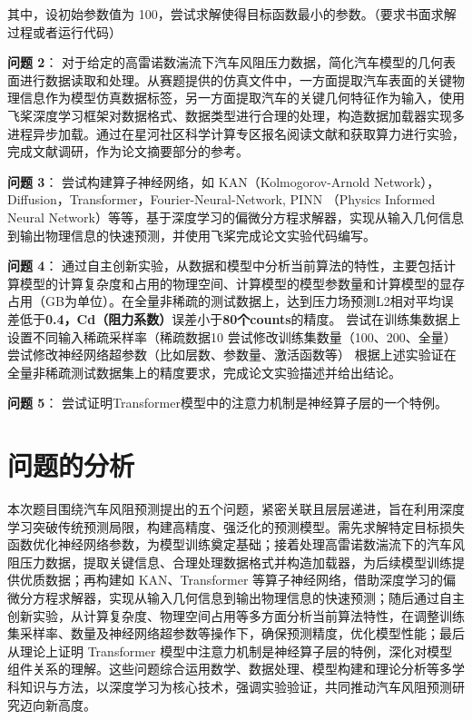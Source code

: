 \documentclass{MMCStyle}
\begin{document}
其中，设初始参数值为 100，尝试求解使得目标函数最小的参数。（要求书面求解过程或者运行代码）

\textbf{问题 2}：
对于给定的高雷诺数湍流下汽车风阻压力数据，简化汽车模型的几何表面进行数据读取和处理。从赛题提供的仿真文件中，一方面提取汽车表面的关键物理信息作为模型仿真数据标签，另一方面提取汽车的关键几何特征作为输入，使用飞桨深度学习框架对数据格式、数据类型进行合理的处理，构造数据加载器实现多进程异步加载。通过在星河社区科学计算专区报名阅读文献和获取算力进行实验，完成文献调研，作为论文摘要部分的参考。

\textbf{问题 3}：
尝试构建算子神经网络，如 KAN（Kolmogorov-Arnold Network），Diffusion，Transformer，Fourier-Neural-Network, PINN （Physics Informed Neural Network）等等，基于深度学习的偏微分方程求解器，实现从输入几何信息到输出物理信息的快速预测，并使用飞桨完成论文实验代码编写。

\textbf{问题 4}：
通过自主创新实验，从数据和模型中分析当前算法的特性，主要包括计算模型的计算复杂度和占用的物理空间、计算模型的模型参数量和计算模型的显存占用（GB为单位）。在全量非稀疏的测试数据上，达到压力场预测L2相对平均误差低于\textbf{0.4，Cd（阻力系数）}误差小于\textbf{80个counts}的精度。
尝试在训练集数据上设置不同输入稀疏采样率（稀疏数据10%
尝试修改训练集数量（100、200、全量）
尝试修改神经网络超参数（比如层数、参数量、激活函数等）
根据上述实验证在全量非稀疏测试数据集上的精度要求，完成论文实验描述并给出结论。


\textbf{问题 5}：
尝试证明Transformer模型中的注意力机制是神经算子层的一个特例。

	\section{问题的分析}


本次题目围绕汽车风阻预测提出的五个问题，紧密关联且层层递进，旨在利用深度学习突破传统预测局限，构建高精度、强泛化的预测模型。需先求解特定目标损失函数优化神经网络参数，为模型训练奠定基础；接着处理高雷诺数湍流下的汽车风阻压力数据，提取关键信息、合理处理数据格式并构造加载器，为后续模型训练提供优质数据；再构建如 KAN、Transformer 等算子神经网络，借助深度学习的偏微分方程求解器，实现从输入几何信息到输出物理信息的快速预测；随后通过自主创新实验，从计算复杂度、物理空间占用等多方面分析当前算法特性，在调整训练集采样率、数量及神经网络超参数等操作下，确保预测精度，优化模型性能；最后从理论上证明 Transformer 模型中注意力机制是神经算子层的特例，深化对模型组件关系的理解。这些问题综合运用数学、数据处理、模型构建和理论分析等多学科知识与方法，以深度学习为核心技术，强调实验验证，共同推动汽车风阻预测研究迈向新高度。
\end{document}
